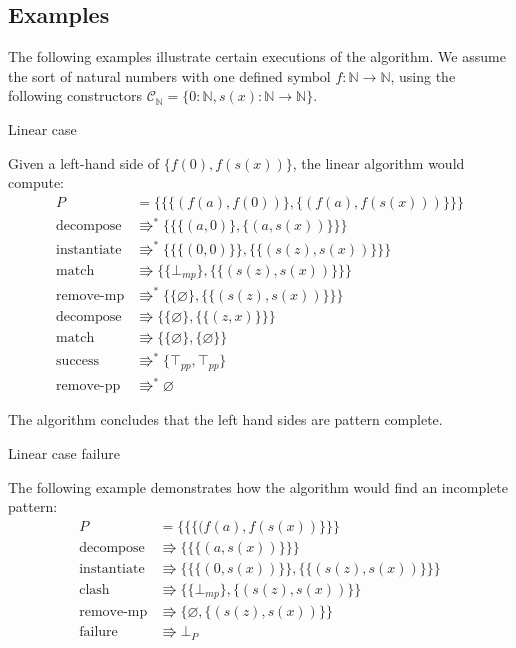 \subsection{Examples} \label{examples-alg}

The following examples illustrate certain executions of the algorithm. We assume the sort of natural numbers with one defined symbol $f : \mathbb{N} \rightarrow \mathbb{N}$, using the following constructors $\mathcal{C}_{\mathbb{N}} = \{0 : \mathbb{N}, s(x) : \mathbb{N} \rightarrow \mathbb{N}\}$.

\begin{example} Linear case \label{ex-thiemann-lin}

Given a left-hand side of $\{f(0), f(s(x))\}$, the linear algorithm would compute:
\begin{align*}
    P &= \{\{\{(f(a), f(0))\}, \{(f(a), f(s(x)))\}\}\}\\
\text{decompose} &\Rrightarrow^{*} \{\{\{(a, 0)\}, \{(a, s(x))\}\}\} \\
\text{instantiate} &\Rrightarrow^{*} \{\{\{(0, 0)\}\}, \{\{(s(z), s(x))\}\}\} \\
\text{match} &\Rrightarrow \{\{\bot_{mp}\}, \{\{(s(z), s(x))\}\}\} \\
\text{remove-mp} &\Rrightarrow^{*} \{\{\varnothing\}, \{\{(s(z), s(x))\}\}\} \\
\text{decompose} &\Rrightarrow \{\{\varnothing\}, \{\{(z, x)\}\}\} \\
\text{match} &\Rrightarrow \{\{\varnothing\}, \{\varnothing\}\} \\
\text{success} &\Rrightarrow^{*} \{\top_{pp}, \top_{pp}\} \\
\text{remove-pp} &\Rrightarrow^{*} \varnothing
\end{align*}
\end{example}

The algorithm concludes that the left hand sides are pattern complete.

\begin{example} Linear case failure \label{ex-thiemann-lin-fail}

The following example demonstrates how the algorithm would find an incomplete pattern:
\begin{align*}
    P &= \{\{\{(f(a), f(s(x))\}\}\}\\
\text{decompose} &\Rrightarrow \{\{\{(a, s(x))\}\}\} \\
\text{instantiate} &\Rrightarrow \{\{\{(0, s(x))\}\}, \{\{(s(z), s(x))\}\}\} \\
\text{clash} &\Rrightarrow \{\{\bot_{mp}\}, \{(s(z), s(x))\}\} \\
\text{remove-mp} &\Rrightarrow \{\varnothing, \{(s(z), s(x))\}\} \\
\text{failure} &\Rrightarrow \bot_{P}
\end{align*}
\end{example}

